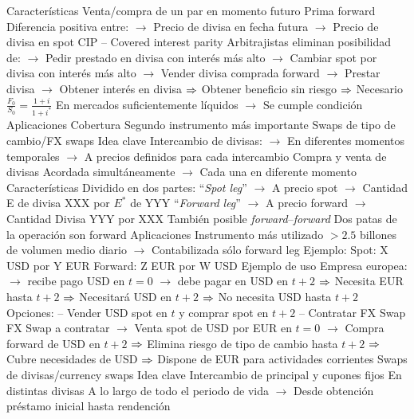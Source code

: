 \documentclass{nuevotema}
\begin{document}
\begin{esquemal}
			\3 Características
				\4 Venta/compra de un par en momento futuro
				\4 Prima forward
				\4[] Diferencia positiva entre:
				\4[] $\to$ Precio de divisa en fecha futura
				\4[] $\to$ Precio de divisa en spot
				\4 CIP -- Covered interest parity
				\4[] Arbitrajistas eliminan posibilidad de:
				\4[] $\to$ Pedir prestado en divisa con interés más alto
				\4[] $\to$ Cambiar spot por divisa con interés más alto
				\4[] $\to$ Vender divisa comprada forward
				\4[] $\to$ Prestar divisa
				\4[] $\to$ Obtener interés en divisa
				\4[] $\Rightarrow$ Obtener beneficio sin riesgo
				\4[] $\Rightarrow$ Necesario $\frac{F_0}{S_0} = \frac{1+i}{1+i^*}$
				\4[] En mercados suficientemente líquidos
				\4[] $\to$ Se cumple condición
			\3 Aplicaciones
				\4 Cobertura
				\4 Segundo instrumento más importante
		\2 Swaps de tipo de cambio/FX swaps
			\3 Idea clave
				\4 Intercambio de divisas:
				\4[] $\to$ En diferentes momentos temporales
				\4[] $\to$ A precios definidos para cada intercambio
				\4 Compra y venta de divisas
				\4[] Acordada simultáneamente
				\4[] $\to$ Cada una en diferente momento
			\3 Características
				\4 Dividido en dos partes:
				\4[] ``\textit{Spot leg}''
				\4[] $\to$ A precio spot
				\4[] $\to$ Cantidad E de divisa XXX por $E^*$ de YYY
				\4[] ``\textit{Forward leg}''
				\4[] $\to$ A precio forward
				\4[] $\to$ Cantidad Divisa YYY por XXX
				\4 También posible \textit{forward}--\textit{forward}
				\4[] Dos patas de la operación son forward
			\3 Aplicaciones
				\4 Instrumento más utilizado
				\4[] $>2.5$ billones de volumen medio diario
				\4[] $\to$ Contabilizada sólo forward leg
				\4 Ejemplo:
				\4[] Spot: X USD por Y EUR
				\4[] Forward: Z EUR por W USD
				\4 Ejemplo de uso
				\4[] Empresa europea:
				\4[] $\to$ recibe pago USD en $t=0$
				\4[] $\to$ debe pagar en USD en $t+2$
				\4[] $\Rightarrow$ Necesita EUR hasta $t+2$
				\4[] $\Rightarrow$ Necesitará USD en $t+2$
				\4[] $\Rightarrow$ No necesita USD hasta $t+2$
				\4[] Opciones:
				\4[] -- Vender USD spot en $t$ y comprar spot en $t+2$
				\4[] -- Contratar FX Swap
				\4[] FX Swap a contratar
				\4[] $\to$ Venta spot de USD por EUR en $t=0$
				\4[] $\to$ Compra forward de USD en $t+2$
				\4[] $\Rightarrow$ Elimina riesgo de tipo de cambio hasta $t+2$
				\4[] $\Rightarrow$ Cubre necesidades de USD
				\4[] $\Rightarrow$ Dispone de EUR para actividades corrientes
		\2 Swaps de divisas/currency swaps
			\3 Idea clave
				\4 Intercambio de principal y cupones fijos
				\4[] En distintas divisas
				\4[] A lo largo de todo el periodo de vida
				\4[] $\to$ Desde obtención préstamo inicial hasta rendención

\end{esquemal}
\end{document}

